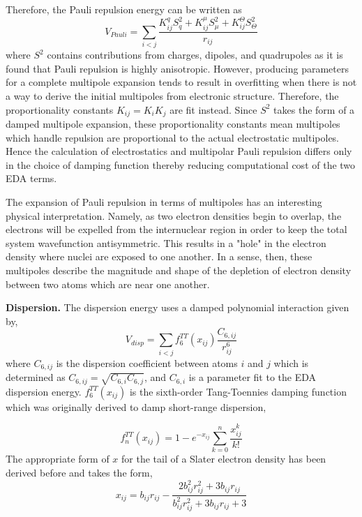 \documentclass[journal=jctcce,manuscript=article]{achemso}
\begin{document}
Therefore, the Pauli repulsion energy can be written as
\begin{equation}
  V_{Pauli}=\sum_{i<j}\frac{K_{ij}^q S^2_{q}+K_{ij}^\mu S^2_{\mu}+K_{ij}^\Theta S^2_{\Theta}}{r_{ij}}
\label{eq:pauli}
\end{equation}
\noindent
where $S^2$ contains contributions from charges, dipoles, and quadrupoles as it is found that Pauli repulsion is highly anisotropic. However, producing parameters for a complete multipole expansion
tends to result in overfitting when there is not a way to derive the initial multipoles
from electronic structure. Therefore, the proportionality constants $K_{ij}=K_iK_j$ are fit instead. Since $S^2$ takes the form of a damped multipole expansion\cite{rackers2019classical}, these proportionality
constants mean multipoles which handle repulsion are proportional to the actual electrostatic
multipoles. Hence the calculation of electrostatics and
multipolar Pauli repulsion differs only in the choice of damping function thereby reducing computational cost
of the two EDA terms.

The expansion of Pauli repulsion in terms of multipoles has an interesting physical interpretation.
Namely, as two electron densities begin to overlap, the electrons will be expelled
from the internuclear region in order to keep the total system wavefunction antisymmetric.
This results in a "hole" in the electron density where nuclei are exposed to one another.
In a sense, then, these multipoles describe the magnitude and shape of the depletion of electron density between two atoms which are near one another. 

\textbf{Dispersion.} The dispersion energy uses a damped
polynomial interaction given by,
\begin{equation}
  V_{disp}=\sum_{i<j}f_6^{TT}(x_{ij})\frac{C_{6,ij}}{r_{ij}^6}
  \label{eq:disp}
\end{equation}
\noindent
where $C_{6,ij}$ is the dispersion coefficient between atoms
$i$ and $j$ which is determined as $C_{6,ij}=\sqrt{C_{6,i}C_{6,j}}$, and $C_{6,i}$ is
a parameter fit to the EDA dispersion energy. $f_6^{TT}(x_{ij})$ is the sixth-order
Tang-Toennies damping function\cite{tang1984improved} which was originally derived
to damp short-range dispersion,

\begin{equation}
  f_n^{TT}(x_{ij}) = 1-e^{-x_{ij}}\sum_{k=0}^n\frac{x_{ij}^k}{k!}
  \label{eq:TT}
\end{equation}
The appropriate form of $x$ for the tail of a Slater electron density
has been derived before\cite{van2016beyond} and takes the form,
\begin{equation}
  x_{ij}=b_{ij}r_{ij}-\frac{2b_{ij}^2r_{ij}^2+3b_{ij}r_{ij}}{b_{ij}^2r_{ij}^2+3b_{ij}r_{ij}+3}
  \label{eq:TT_x}
\end{equation}
\end{document}
